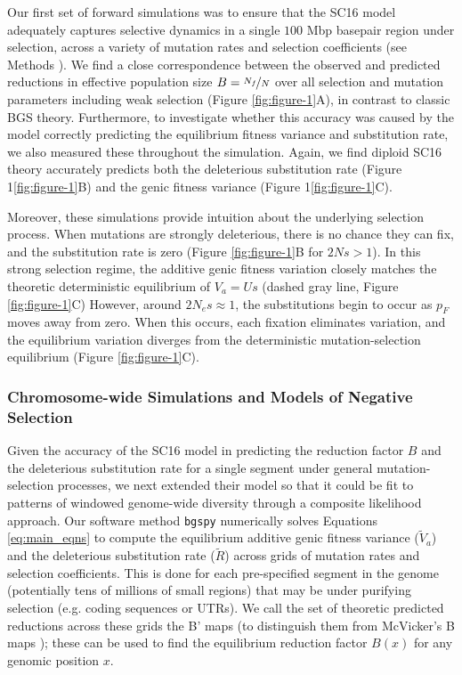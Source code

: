 \documentclass[11pt]{article}
\begin{document}
Our first set of forward simulations was to ensure that the SC16 model
adequately captures selective dynamics in a single $100$ Mbp basepair region
under selection, across a variety of mutation rates and selection
coefficients (see Methods ). We find a close
correspondence between the observed and predicted reductions in effective
population size $B=\nicefrac{N_f}{N}$ over all selection and mutation
parameters including weak selection (Figure \ref{fig:figure-1}A), in contrast
to classic BGS theory. Furthermore, to investigate whether this accuracy was
caused by the model correctly predicting the equilibrium fitness variance and
substitution rate, we also measured these throughout the simulation. Again, we find
diploid SC16 theory accurately predicts both the deleterious substitution rate (Figure
1\ref{fig:figure-1}B) and the genic fitness variance (Figure
1\ref{fig:figure-1}C).

Moreover, these simulations provide intuition about the underlying 
selection process. When mutations are strongly deleterious, there is no chance
they can fix, and the substitution rate is zero (Figure \ref{fig:figure-1}B for $2Ns
> 1$). In this strong selection regime, the additive genic fitness variation
closely matches the theoretic deterministic equilibrium of $V_a = Us$ (dashed
gray line, Figure \ref{fig:figure-1}C) However, around $2N_e s \approx 1$, the
substitutions begin to occur as $p_F$ moves away from zero. When this occurs, each fixation eliminates variation, and the equilibrium variation diverges from the
deterministic mutation-selection equilibrium (Figure \ref{fig:figure-1}C).

\subsubsection*{Chromosome-wide Simulations and Models of Negative Selection}
\label{sec:chrom-sims}

Given the accuracy of the SC16 model in predicting the reduction factor $B$ and
the deleterious substitution rate for a single segment under general mutation-selection processes, we next extended their model so that it could be fit to patterns of windowed genome-wide
diversity through a composite likelihood approach. Our software method 
\texttt{bgspy} numerically solves Equations
\eqref{eq:main_eqns} to compute the equilibrium additive genic fitness variance
($\widetilde{V}_a$) and the deleterious substitution rate ($\widetilde{R}$) across grids of mutation
rates and selection coefficients. This is done for each pre-specified segment
in the genome (potentially tens of millions of small regions) that may be under purifying selection (e.g. coding sequences or UTRs). We call the set of theoretic predicted reductions across these grids the B' maps
(to distinguish them from McVicker's B maps \parencite{McVicker2009-ax});
these can be used to find
the equilibrium reduction factor $B(x)$ for any genomic position $x$.
\end{document}
